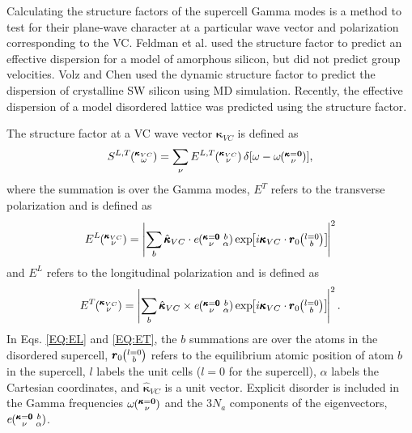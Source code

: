 Calculating the structure factors of the supercell Gamma   
modes is a method to test for their plane-wave 
character at a particular wave vector and 
polarization corresponding to the VC. 
\cite{allen_diffusons_1999,feldman_numerical_1999} 
Feldman et al. used the structure factor to predict an effective 
dispersion for a model of amorphous silicon, but did not predict 
group velocities.\cite{feldman_numerical_1999} 
Volz and Chen used the dynamic structure factor to predict the
dispersion of crystalline SW silicon using MD simulation.
\cite{volz_molecular-dynamics_2000} Recently, the effective dispersion 
of a model disordered lattice was predicted using the structure factor.
\cite{beltukov_ioffe-regel_2013}

The structure factor at a VC wave vector 
$\pmb{\kappa}_{VC}$ is defined as\cite{allen_diffusons_1999} 
\begin{equation}\label{EQ:SLT}
S^{L,T}\kvcw = 
\sum_{\nu} E^{L,T}\kvcv
\delta [\omega-\omega\kgv],
\end{equation}
where the summation is over the Gamma modes, $E^{T}$ refers 
to the transverse polarization and is defined as
\begin{equation}\label{EQ:EL}
E^L\kvcv = 
\left|
\sum_{b} 
\hat{\pmb{\kappa}}_{VC} \cdot e\kgvba 
\EXP{i\pmb{\kappa}_{VC}\cdot\pmb{r}_0\ab{l=0}{b}} 
\right|^2
\end{equation}
and $E^{L}$ refers to the longitudinal polarization and is defined as
\begin{equation}\label{EQ:ET}
E^T\kvcv = 
\left|
\sum_{b} 
\hat{\pmb{\kappa}}_{VC} \times e\kgvba 
\EXP{i\pmb{\kappa}_{VC}\cdot\pmb{r}_0\ab{l=0}{b}} 
\right|^2.
\end{equation}
In Eqs. \eqref{EQ:EL} and \eqref{EQ:ET}, the $b$ summations are 
over the atoms in the disordered supercell, 
$\pmb{r}_0\ab{l=0}{b}$ refers to the equilibrium atomic position of 
atom $b$ in the supercell, $l$ labels the unit cells 
($l=0$ for the supercell), 
$\alpha$ labels the Cartesian coordinates, and 
$\hat{\pmb{\kappa}}_{VC}$ is a unit vector.  
Explicit disorder is included in the Gamma frequencies 
$\omega\mspace{-4.0mu}\left(\mspace{-8.0mu} \begin{smallmatrix}&\pmb{\kappa}=\mathbf{0} \\&\nu\end{smallmatrix} \mspace{-3.0mu}\right)$ and the $3N_a$ components of the eigenvectors, $e\mspace{-4.0mu}\left(\mspace{-8.0mu} \begin{smallmatrix} &\pmb{\kappa}=\pmb{0} &b \\ &\nu &\alpha\end{smallmatrix}\mspace{-3.0mu}\right)$.

